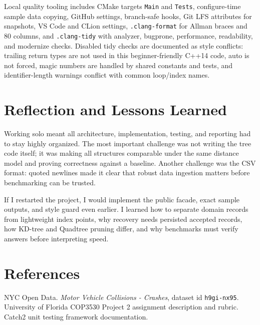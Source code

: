 \documentclass[12pt]{article}
\begin{document}
Local quality tooling includes CMake targets \texttt{Main} and \texttt{Tests},
configure-time sample data copying, GitHub settings, branch-safe hooks, Git LFS
attributes for snapshots, VS Code and CLion settings, \texttt{.clang-format}
for Allman braces and 80 columns, and \texttt{.clang-tidy} with analyzer,
bugprone, performance, readability, and modernize checks. Disabled tidy checks
are documented as style conflicts: trailing return types are not used in this
beginner-friendly C++14 code, auto is not forced, magic numbers are handled by
shared constants and tests, and identifier-length warnings conflict with common
loop/index names.

\section{Reflection and Lessons Learned}
Working solo meant all architecture, implementation, testing, and reporting had
to stay highly organized. The most important challenge was not writing the tree
code itself; it was making all structures comparable under the same distance
model and proving correctness against a baseline. Another challenge was the CSV
format: quoted newlines made it clear that robust data ingestion matters before
benchmarking can be trusted.

If I restarted the project, I would implement the public facade, exact sample
outputs, and style guard even earlier. I learned how to separate domain records
from lightweight index points, why recovery needs persisted accepted records,
how KD-tree and Quadtree pruning differ, and why benchmarks must verify answers
before interpreting speed.

\section{References}
NYC Open Data. \emph{Motor Vehicle Collisions - Crashes}, dataset id
\texttt{h9gi-nx95}.\newline
University of Florida COP3530 Project 2 assignment description and rubric.\newline
Catch2 unit testing framework documentation.
\end{document}
